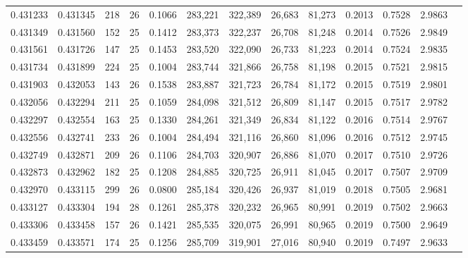 \begin{tabular}{rrrrrrrrrrrrr}
0.431233 & 0.431345 &   218 &  26 &                                     0.1066 & 283,221 & 322,389 &  26,683 &  81,273 & 0.2013 & 0.7528 & 2.9863 \\
0.431349 & 0.431560 &   152 &  25 &                                     0.1412 & 283,373 & 322,237 &  26,708 &  81,248 & 0.2014 & 0.7526 & 2.9849 \\
0.431561 & 0.431726 &   147 &  25 &                                     0.1453 & 283,520 & 322,090 &  26,733 &  81,223 & 0.2014 & 0.7524 & 2.9835 \\
0.431734 & 0.431899 &   224 &  25 &                                     0.1004 & 283,744 & 321,866 &  26,758 &  81,198 & 0.2015 & 0.7521 & 2.9815 \\
0.431903 & 0.432053 &   143 &  26 &                                     0.1538 & 283,887 & 321,723 &  26,784 &  81,172 & 0.2015 & 0.7519 & 2.9801 \\
0.432056 & 0.432294 &   211 &  25 &                                     0.1059 & 284,098 & 321,512 &  26,809 &  81,147 & 0.2015 & 0.7517 & 2.9782 \\
0.432297 & 0.432554 &   163 &  25 &                                     0.1330 & 284,261 & 321,349 &  26,834 &  81,122 & 0.2016 & 0.7514 & 2.9767 \\
0.432556 & 0.432741 &   233 &  26 &                                     0.1004 & 284,494 & 321,116 &  26,860 &  81,096 & 0.2016 & 0.7512 & 2.9745 \\
0.432749 & 0.432871 &   209 &  26 &                                     0.1106 & 284,703 & 320,907 &  26,886 &  81,070 & 0.2017 & 0.7510 & 2.9726 \\
0.432873 & 0.432962 &   182 &  25 &                                     0.1208 & 284,885 & 320,725 &  26,911 &  81,045 & 0.2017 & 0.7507 & 2.9709 \\
0.432970 & 0.433115 &   299 &  26 &                                     0.0800 & 285,184 & 320,426 &  26,937 &  81,019 & 0.2018 & 0.7505 & 2.9681 \\
0.433127 & 0.433304 &   194 &  28 &                                     0.1261 & 285,378 & 320,232 &  26,965 &  80,991 & 0.2019 & 0.7502 & 2.9663 \\
0.433306 & 0.433458 &   157 &  26 &                                     0.1421 & 285,535 & 320,075 &  26,991 &  80,965 & 0.2019 & 0.7500 & 2.9649 \\
0.433459 & 0.433571 &   174 &  25 &                                     0.1256 & 285,709 & 319,901 &  27,016 &  80,940 & 0.2019 & 0.7497 & 2.9633 \\

\end{tabular}
